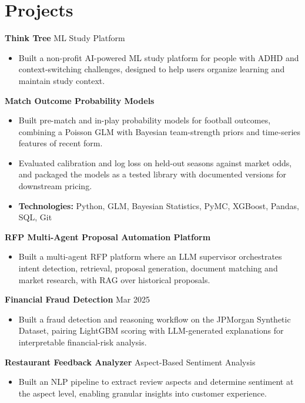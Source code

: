 \documentclass[10pt,a4paper]{article}
\begin{document}
\section{Projects}
\textbf{Think Tree} \textbar{} ML Study Platform\par
\begin{itemize}
  \item Built a non-profit AI-powered ML study platform for people with ADHD and context-switching challenges, designed to help users organize learning and maintain study context.
\end{itemize}
\textbf{Match Outcome Probability Models}\par
\begin{itemize}
  \item Built pre-match and in-play probability models for football outcomes, combining a Poisson GLM with Bayesian team-strength priors and time-series features of recent form.
  \item Evaluated calibration and log loss on held-out seasons against market odds, and packaged the models as a tested library with documented versions for downstream pricing.
  \item \textbf{Technologies:} Python, GLM, Bayesian Statistics, PyMC, XGBoost, Pandas, SQL, Git
\end{itemize}
\textbf{RFP Multi-Agent Proposal Automation Platform}\par
\begin{itemize}
  \item Built a multi-agent RFP platform where an LLM supervisor orchestrates intent detection, retrieval, proposal generation, document matching and market research, with RAG over historical proposals.
\end{itemize}
\textbf{Financial Fraud Detection} \textbar{} Mar 2025\par
\begin{itemize}
  \item Built a fraud detection and reasoning workflow on the JPMorgan Synthetic Dataset, pairing LightGBM scoring with LLM-generated explanations for interpretable financial-risk analysis.
\end{itemize}
\textbf{Restaurant Feedback Analyzer} \textbar{} Aspect-Based Sentiment Analysis\par
\begin{itemize}
  \item Built an NLP pipeline to extract review aspects and determine sentiment at the aspect level, enabling granular insights into customer experience.
\end{itemize}
\end{document}
